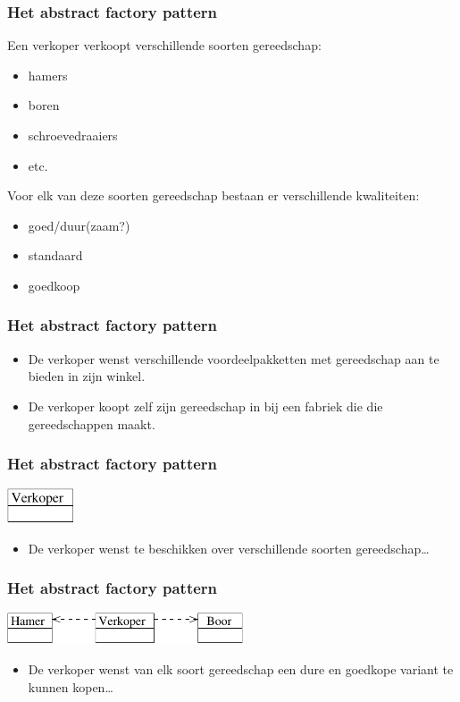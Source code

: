 \documentclass{beamer}
\begin{document}
\begin{frame}
\frametitle{Het abstract factory pattern}
Een verkoper verkoopt verschillende soorten gereedschap:
\begin{itemize}
\item hamers
\item boren
\item schroevedraaiers
\item etc.
\end{itemize}
Voor elk van deze soorten gereedschap bestaan er verschillende kwaliteiten:
\begin{itemize}
\item goed/duur(zaam?)
\item standaard
\item goedkoop
\end{itemize}
\end{frame}

\begin{frame}
\frametitle{Het abstract factory pattern}
\begin{itemize}
\item De verkoper wenst verschillende voordeelpakketten met gereedschap aan te bieden in zijn winkel.
\item De verkoper koopt zelf zijn gereedschap in bij een fabriek die die gereedschappen maakt.
\end{itemize}
\end{frame}

\begin{frame}
\frametitle{Het abstract factory pattern}
\begin{center}
\includegraphics[width=2cm]{af1}
\end{center}\pause
\begin{itemize}
\item De verkoper wenst te beschikken over verschillende soorten gereedschap\ldots
\end{itemize}
\end{frame}


\begin{frame}
\frametitle{Het abstract factory pattern}
\begin{center}
\includegraphics[width=7cm]{af2}
\end{center}
\begin{itemize}
\item De verkoper wenst van elk soort gereedschap een dure en goedkope variant te kunnen kopen\ldots
\end{itemize}
\end{frame}
\end{document}
